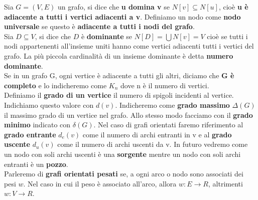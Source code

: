 Sia $G=(V,E)$ un grafo, si dice che \textbf{u domina v} se $N[v] \subseteq N[u]$, cioè \textbf{u è adiacente a tutti i vertici adiacenti a v}.
Definiamo un nodo come \textbf{nodo universale} se questo è \textbf{adiacente a tutti i nodi del grafo}.\\
Sia $D \subseteq V$, si dice che $D$ è \textbf{dominante} se $N[D] = \bigcup N[v] = V$  cioè se tutti i nodi appartenenti all'insieme uniti hanno come vertici adiacenti tutti i vertici del grafo. La più piccola cardinalità di un insieme dominante è detta \textbf{numero dominante}. \\
Se in un grafo G, ogni vertice è adiacente a tutti gli altri, diciamo che \textbf{G è completo} e lo indicheremo come $K_n$ dove n è il numero di vertici.\\
Definiamo il \textbf{grado di un vertice} il numero di spigoli incidenti al vertice. Indichiamo questo valore con $d(v)$. 
Indicheremo come \textbf{grado massimo} $\Delta(G)$ il massimo grado di un vertice nel grafo. Allo stesso modo facciamo con il \textbf{grado minimo} indicato con $\delta(G)$.
Nel caso di grafi orientati faremo riferimento al \textbf{grado entrante} $d_e(v)$ come il numero di archi entranti in v e al \textbf{grado uscente} $d_u(v)$ come il numero di archi uscenti da v. 
In futuro vedremo come un nodo con soli archi uscenti è una \textbf{sorgente} mentre un nodo con soli archi entranti è un \textbf{pozzo}.\\
Parleremo di \textbf{grafi orientati pesati} se, a ogni arco o nodo sono associati dei pesi $w$. Nel caso in cui il peso è associato all'arco, allora $w: E \rightarrow R$, altrimenti  $w: V \rightarrow R$.


